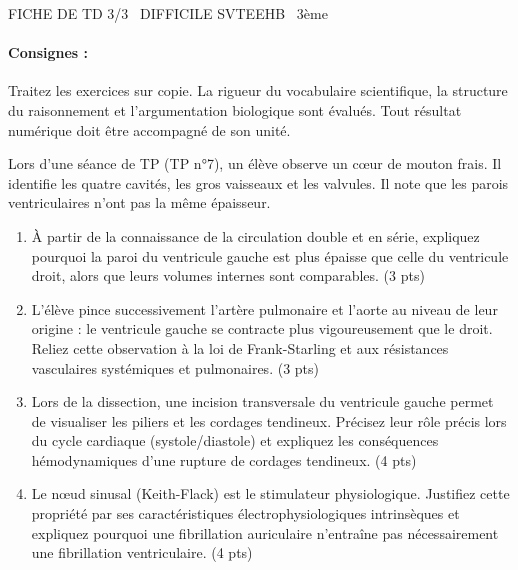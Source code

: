 \documentclass[11pt]{article}
\begin{document}
\begin{tcolorbox}[enhanced,colback=popink,colframe=popink,arc=10pt,boxrule=0pt,left=12pt,right=12pt,top=9pt,bottom=9pt]
{\color{white}\popxbold\small FICHE DE TD 3/3 \textbullet\ DIFFICILE \hfill SVTEEHB \textbullet\ 3ème\par}
\end{tcolorbox}
\vspace{4pt}
\paragraph{Consignes :} Traitez les exercices sur copie. La rigueur du vocabulaire scientifique, la structure du raisonnement et l'argumentation biologique sont évalués. Tout résultat numérique doit être accompagné de son unité.

\begin{exercice}
Lors d'une séance de TP (TP n°7), un élève observe un cœur de mouton frais. Il identifie les quatre cavités, les gros vaisseaux et les valvules. Il note que les parois ventriculaires n'ont pas la même épaisseur.
\begin{enumerate}
    \item À partir de la connaissance de la circulation double et en série, expliquez pourquoi la paroi du ventricule gauche est plus épaisse que celle du ventricule droit, alors que leurs volumes internes sont comparables. (3 pts)
    \item L'élève pince successivement l'artère pulmonaire et l'aorte au niveau de leur origine : le ventricule gauche se contracte plus vigoureusement que le droit. Reliez cette observation à la loi de Frank-Starling et aux résistances vasculaires systémiques et pulmonaires. (3 pts)
    \item Lors de la dissection, une incision transversale du ventricule gauche permet de visualiser les piliers et les cordages tendineux. Précisez leur rôle précis lors du cycle cardiaque (systole/diastole) et expliquez les conséquences hémodynamiques d'une rupture de cordages tendineux. (4 pts)
    \item Le nœud sinusal (Keith-Flack) est le stimulateur physiologique. Justifiez cette propriété par ses caractéristiques électrophysiologiques intrinsèques et expliquez pourquoi une fibrillation auriculaire n'entraîne pas nécessairement une fibrillation ventriculaire. (4 pts)
\end{enumerate}
\end{exercice}
\end{document}
